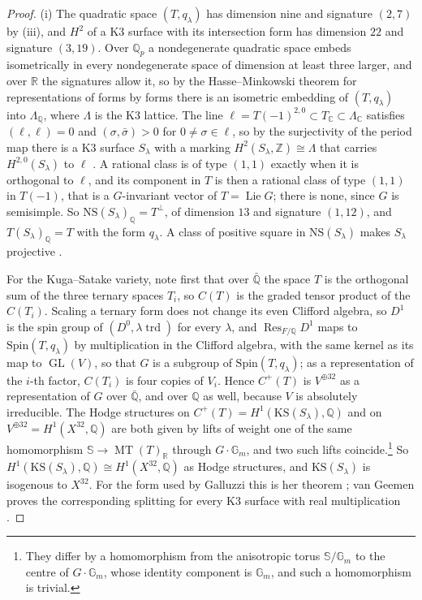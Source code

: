 \documentclass[11pt,reqno]{amsart}
\theoremstyle{plain}
\theoremstyle{definition}
\theoremstyle{remark}
\newcommand{\QQ}{\mathbb{Q}}
\newcommand{\ZZ}{\mathbb{Z}}
\newcommand{\RR}{\mathbb{R}}
\newcommand{\CC}{\mathbb{C}}
\newcommand{\NS}{\mathrm{NS}}
\DeclareMathOperator{\Res}{Res}
\DeclareMathOperator{\MT}{MT}
\DeclareMathOperator{\GL}{GL}
\begin{document}
\begin{proof}
(i) The quadratic space $(T,q_{\lambda})$ has dimension nine and signature
$(2,7)$ by (iii), and $H^{2}$ of a K3 surface with its
intersection form has dimension $22$ and signature $(3,19)$. Over $\QQ_{p}$
a nondegenerate quadratic space embeds isometrically in every nondegenerate
space of dimension at least three larger, and over $\RR$ the signatures
allow it, so by the Hasse--Minkowski theorem for representations of forms by
forms \cite[\S\S63, 66]{OMe00} there is an isometric embedding of
$(T,q_{\lambda})$ into $\Lambda_{\QQ}$, where $\Lambda$ is the K3 lattice.
The line $\ell=T(-1)^{2,0}\subset T_{\CC}\subset\Lambda_{\CC}$ satisfies
$(\ell,\ell)=0$ and $(\sigma,\bar{\sigma})>0$ for $0\ne\sigma\in\ell$, so by the
surjectivity of the period map there is a K3 surface $S_{\lambda}$ with a
marking $H^{2}(S_{\lambda},\ZZ)\cong\Lambda$ that carries
$H^{2,0}(S_{\lambda})$ to $\ell$ \cite[Chs.~6--7]{Huy16}. A rational class
is of type $(1,1)$ exactly when it is orthogonal to $\ell$, and its component
in $T$ is then a rational class of type $(1,1)$ in $T(-1)$, that is a
$G$-invariant vector of $T=\operatorname{Lie}G$; there is none, since $G$ is
semisimple. So $\NS(S_{\lambda})_{\QQ}=T^{\perp}$, of dimension $13$ and
signature $(1,12)$, and $T(S_{\lambda})_{\QQ}=T$ with the form $q_{\lambda}$.
A class of positive square in $\NS(S_{\lambda})$ makes $S_{\lambda}$
projective \cite[Ch.~8]{Huy16}.

For the Kuga--Satake variety, note first that over $\bar{\QQ}$ the space $T$
is the orthogonal sum of the three ternary spaces $T_{i}$, so $C(T)$ is the
graded tensor product of the $C(T_{i})$. Scaling a ternary form does not
change its even Clifford algebra, so $D^{1}$ is the spin group of
$(D^{0},\lambda\operatorname{trd})$ for every $\lambda$, and
$\Res_{F/\QQ}D^{1}$ maps to $\mathrm{Spin}(T,q_{\lambda})$ by multiplication
in the Clifford algebra, with the same kernel as its map to $\GL(V)$, so that
$G$ is a subgroup of $\mathrm{Spin}(T,q_{\lambda})$; as a representation of
the $i$-th factor, $C(T_{i})$ is four copies of $V_{i}$. Hence $C^{+}(T)$ is
$V^{\oplus32}$ as a representation of $G$ over $\bar{\QQ}$, and over $\QQ$ as
well, because $V$ is absolutely irreducible. The Hodge structures on
$C^{+}(T)=H^{1}(\mathrm{KS}(S_{\lambda}),\QQ)$ and on
$V^{\oplus32}=H^{1}(X^{32},\QQ)$ are both given by lifts of weight one of the
same homomorphism $\mathbb{S}\to\MT(T)_{\RR}$ through $G\cdot\mathbb{G}_{m}$,
and two such lifts coincide.\footnote{They differ by a homomorphism from the
anisotropic torus $\mathbb{S}/\mathbb{G}_{m}$ to the centre of
$G\cdot\mathbb{G}_{m}$, whose identity component is $\mathbb{G}_{m}$, and
such a homomorphism is trivial.} So
$H^{1}(\mathrm{KS}(S_{\lambda}),\QQ)\cong H^{1}(X^{32},\QQ)$ as Hodge
structures, and $\mathrm{KS}(S_{\lambda})$ is isogenous to $X^{32}$. For the
form used by Galluzzi this is her theorem \cite{Gal00}; van Geemen proves the
corresponding splitting for every K3 surface with real multiplication
\cite{vG08}.


\end{proof}
\end{document}
